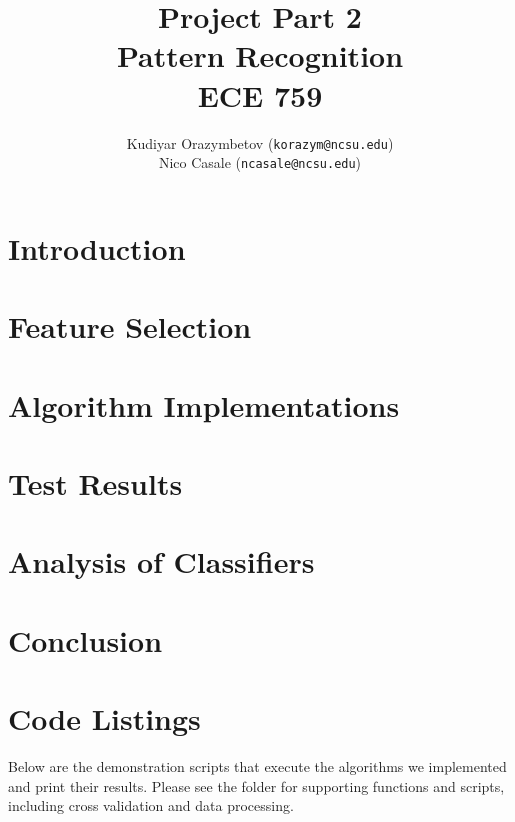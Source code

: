 \documentclass[]{ncmathy}
\newcommand{\theassignment}{Project Part 2}
\newcommand{\thecourse}{Pattern Recognition\\ECE 759}
\begin{document}
\title{\theassignment\\\thecourse}
\author{Kudiyar Orazymbetov (\texttt{korazym@ncsu.edu})\\Nico Casale (\texttt{ncasale@ncsu.edu})}

\makeFancyTitle
\setcounter{tocdepth}{2}
\tableofcontents
\pagebreak
\chead{} %
\makeatletter
\let\@starttoc\@multitoc@starttoc
\listoffigures
\listoftables
\lstlistoflistings
\makeatother
\pagebreak
\chead{\textcolor{Red}\thesection :\ \textcolor{Red}\leftmark}

\section{Introduction} 
	

\section{Feature Selection}
	

\section{Algorithm Implementations}
	
        
	

\section{Test Results}
	

\section{Analysis of Classifiers}
	

\section{Conclusion}
	




\section{Code Listings}

Below are the demonstration scripts that execute the algorithms we implemented and print their results. Please see the
 folder for supporting functions and scripts, including cross validation and data processing.




\end{document}
